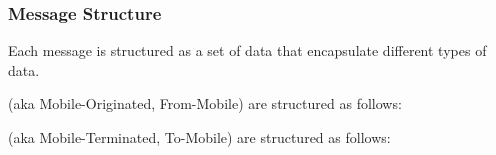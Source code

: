 \documentclass[letterpaper,10pt,english]{sphinxmanual}
\begin{document}
\subsubsection{Message Structure}
\label{\detokenize{otaapi:message-structure}}
Each message is structured as a set of data  that encapsulate different types of data.

 (aka Mobile-Originated, From-Mobile) are structured as follows:

%
\begin{sphinxVerbatim}[commandchars=\\\{\}]
  \PYG{p}{[}
        \PYG{p}{[}
          \PYG{p}{[}
                  \PYG{p}{[}
                          \PYG{p}{[}
                          \PYG{p}{]}
                  \PYG{p}{]}
          \PYG{p}{]}
        \PYG{p}{]}
  \PYG{p}{]}
\end{sphinxVerbatim}

 (aka Mobile-Terminated, To-Mobile) are structured as follows:
\end{document}
